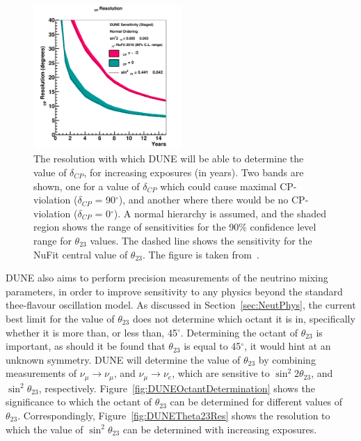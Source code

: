 \begin{figure}
  \centering
  \includegraphics[width=0.5\textwidth]{resdcp_exp_staging_th23band_2017}
  \caption[The resolution with which DUNE will be able to determine the value of $\delta_{CP}$, for increasing exposures]
          {The resolution with which DUNE will be able to determine the value of $\delta_{CP}$, for increasing exposures (in years). Two bands are shown, one for a value of $\delta_{CP}$ which could cause maximal CP-violation ($\delta_{CP}$ = 90$^{\circ}$), and another where there would be no CP-violation ($\delta_{CP}$ = 0$^{\circ}$). A normal hierarchy is assumed, and the shaded region shows the range of sensitivities for the 90\% confidence level range for $\theta_{23}$ values. The dashed line shows the sensitivity for the NuFit central value of $\theta_{23}$. The figure is taken from~\citep{DUNE2377}.}
  \label{fig:DUNECPViolationRes}
\end{figure}

DUNE also aims to perform precision measurements of the neutrino mixing parameters, in order to improve sensitivity to any physics beyond the standard thee-flavour oscillation model. As discussed in Section~\ref{sec:NeutPhys}, the current best limit for the value of $\theta_{23}$ does not determine which octant it is in, specifically whether it is more than, or less than, 45$^{\circ}$. Determining the octant of $\theta_{23}$ is important, as should it be found that $\theta_{23}$ is equal to 45$^{\circ}$, it would hint at an unknown symmetry. DUNE will determine the value of $\theta_{23}$ by combining measurements of $\nu_{\mu} \rightarrow \nu_{\mu}$, and $\nu_{\mu} \rightarrow \nu_{e}$, which are sensitive to $\sin^{2}2\theta_{23}$, and $\sin^2\theta_{23}$, respectively. Figure~\ref{fig:DUNEOctantDetermination} shows the significance to which the octant of $\theta_{23}$ can be determined for different values of $\theta_{23}$. Correspondingly, Figure~\ref{fig:DUNETheta23Res} shows the resolution to which the value of $\sin^{2}\theta_{23}$ can be determined with increasing exposures. \\

